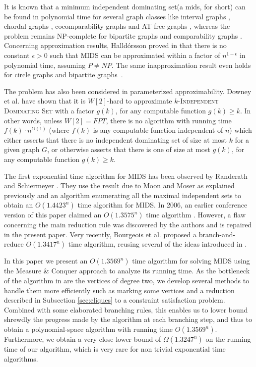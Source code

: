 \documentclass[a4paper,10pt]{article}
\theoremstyle{plain}
\theoremstyle{definition}
\theoremstyle{remark}
\newcommand{\ids}{independent dominating set\xspace}
\newcommand{\MIDSpb}{\textsc{MIDS}\xspace}
\newcommand{\mids}{mids\xspace}
\newcommand{\runtime}{1.3569}
\begin{document}
\medskip

It is known that a minimum \ids (a \mids, for short) can be found in polynomial time for
several graph classes like interval graphs \cite{Chang}, chordal graphs \cite{Farber},
cocomparability graphs \cite{Kratsch} and AT-free graphs \cite{Broersma}, whereas the problem
remains NP-complete for bipartite graphs \cite{Corneil} and comparability
graphs \cite{Corneil}.
Concerning approximation results, Halld\'orsson proved in \cite{Halldorsson}
that there is no constant $\epsilon>0$ such that \MIDSpb can be approximated
within a factor of $n^{1-\epsilon}$ in polynomial time, assuming $P\not =NP$.
The same inapproximation result even holds for circle graphs and bipartite graphs~\cite{Damian}.

The problem has also been considered in parameterized approximability.
Downey et al. \cite{Downey} have shown 
that it is $W[2]$-hard to approximate $k$-\textsc{Independent Dominating Set}
with a factor $g(k)$, for any computable function $g(k) \ge k$.
In other words, unless $W[2]=FPT$,
there is no algorithm with running time $f(k) \cdot n^{O(1)}$ (where $f(k)$ is any computable
function independent of $n$) which either asserts that there is no \ids
of size at most $k$ for a given graph $G$, or otherwise asserts
that there is one of size at most $g(k)$, for any computable function $g(k) \ge k$.

The first exponential time algorithm for \MIDSpb has been observed by Randerath and Schiermeyer \cite{Randerath}.
They use the result due to Moon and Moser \cite{MoonMoser} as explained
previously and an algorithm enumerating all the maximal independent sets
to obtain an $O(1.4423^n)$ time algorithm for \MIDSpb.
In 2006, an earlier conference version of this paper claimed an
$O(1.3575^n)$ time algorithm \cite{WG2006}. However, a flaw concerning 
the main reduction rule was discovered
by the authors and is repaired in the present paper.
Very recently, Bourgeois et al. \cite{BourgeoisSIROCCO2010} proposed a branch-and-reduce $O(1.3417^n)$ time algorithm,
reusing several of the ideas introduced in \cite{WG2006}.


\smallskip

In this paper we present an $O(\runtime^n)$ time algorithm for solving \MIDSpb
using the Measure \& Conquer approach to analyze its running time.
As the bottleneck
of the algorithm in \cite{Randerath} are the vertices of degree two, we develop several methods
to handle them more efficiently such as marking some vertices and a
reduction described in Subsection \ref{sec:cliques} to a constraint satisfaction problem.
Combined with some elaborated branching rules, this enables
us to lower bound shrewdly the progress made by the algorithm at each
branching step, and thus to obtain a polynomial-space algorithm with running time $O(\runtime^n)$.
Furthermore, we obtain a very close lower bound of $\Omega(1.3247^n)$ on the running
time of our algorithm, which is very rare for non trivial exponential time algorithms.
\end{document}
